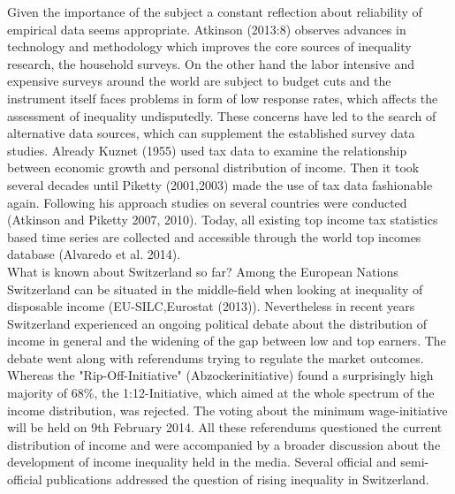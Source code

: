 \documentclass[twoside]{article}\usepackage[]{graphicx}\usepackage[]{color}
\begin{document}
\begin{multicols}{2}
Given the importance of the subject a constant reflection about reliability of empirical data seems appropriate. Atkinson (2013:8) observes advances in technology and methodology which improves the core sources of inequality research, the household surveys.  On the other hand the labor intensive and expensive surveys around the world are subject to budget cuts and the instrument itself faces problems in form of low response rates, which affects the assessment of inequality undisputedly. These concerns have led to the search of alternative data sources, which can supplement the established survey data studies. Already Kuznet (1955) used tax data to examine the relationship between economic growth and personal distribution of income. Then it took several decades until Piketty (2001,2003) made the use of tax data fashionable again. Following his approach studies on several countries were conducted (Atkinson and Piketty 2007, 2010). Today, all existing top income tax statistics based time series are collected and accessible through the world top incomes database (Alvaredo et al. 2014). \\

% 

What is known about Switzerland so far? Among the European Nations Switzerland can be situated in the middle-field when looking at inequality of disposable income (EU-SILC,Eurostat (2013)). Nevertheless in recent years Switzerland experienced  an ongoing political debate about the distribution of income in general and the widening of the gap between low and top earners. The debate went along with referendums trying to regulate the market outcomes. Whereas the "Rip-Off-Initiative" (Abzockerinitiative) found a surprisingly high majority of 68\%, the 1:12-Initiative, which aimed at the whole spectrum of the income distribution, was rejected. The voting about the minimum wage-initiative will be held on 9th February 2014. All these referendums questioned the current distribution of income and were accompanied by a broader discussion about the development of income inequality held in the media. Several official and semi-official publications addressed the question of rising inequality in Switzerland. \\




\end{multicols}
\end{document}
